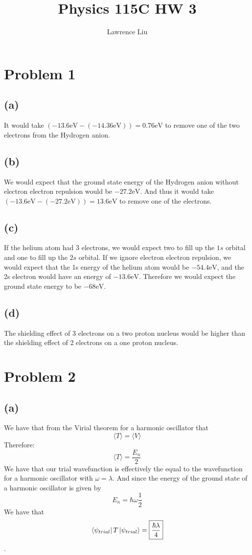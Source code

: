 \documentclass[11pt]{article}
\author{Lawrence Liu}
\title{Physics 115C HW 3}
\begin{document}
\maketitle
\section*{Problem 1}
\subsection*{(a)}
It would take $(-13.6\text{eV} - (-14.36 \text{eV})) = 0.76\text{eV}$ to remove one of the 
two electrons from the Hydrogen anion.
\subsection*{(b)}
We would expect that the ground state energy of the Hydrogen anion without
electron electron repulsion would be $-27.2\text{eV}$. And thus it would take 
$(-13.6\text{eV} - (-27.2 \text{eV})) = 13.6\text{eV}$ to remove one of the
electrons.
\subsection*{(c)}
If the helium atom had 3 electrons, we would expect two to fill up the 
$1s$ orbital and one to fill up the $2s$ orbital. If we ignore
electron electron repulsion, we would expect that the 1s energy 
of the helium atom would be $-54.4\text{eV}$, and the 
2s electron would have an energy of $-13.6\text{eV}$. Therefore
we would expect the ground state energy to be 
$-68\text{eV}$.
\subsection*{(d)}
The shielding effect of 3 electrons on a two 
proton nucleus would be higher than the shielding effect of 2 electrons
on a one proton nucleus.
\section*{Problem 2}
\subsection*{(a)}
We have that from the Virial theorem for a 
harmonic oscillator that
$$\langle T\rangle = \langle V\rangle$$
Therefore:
$$\langle T \rangle =  \frac{E_n}{2}$$
We have that our trial wavefunction is effectively the 
equal to the wavefunction for a harmonic oscillator with
$\omega=\lambda$. And since the energy of the ground state of a 
harmonic oscillator is given by
$$E_n = \hbar\omega\frac{1}{2}$$
We have that
$$\bra{\psi_{trial}}T\ket{\psi_{trial}} = \boxed{\frac{\hbar\lambda}{4}}$$.
\end{document}
